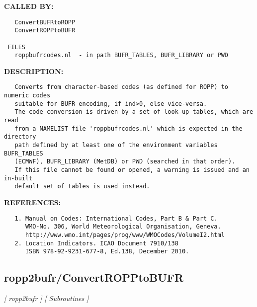 \textbf{CALLED BY:}\hspace{0.08in}\begin{Verbatim}
   ConvertBUFRtoROPP
   ConvertROPPtoBUFR

 FILES
   roppbufrcodes.nl  - in path BUFR_TABLES, BUFR_LIBRARY or PWD
\end{Verbatim}
\textbf{DESCRIPTION:}\hspace{0.08in}\begin{Verbatim}
   Converts from character-based codes (as defined for ROPP) to numeric codes
   suitable for BUFR encoding, if ind>0, else vice-versa.
   The code conversion is driven by a set of look-up tables, which are read
   from a NAMELIST file 'roppbufrcodes.nl' which is expected in the directory
   path defined by at least one of the environment variables BUFR_TABLES
   (ECMWF), BUFR_LIBRARY (MetDB) or PWD (searched in that order).
   If this file cannot be found or opened, a warning is issued and an in-built
   default set of tables is used instead.
\end{Verbatim}
\textbf{REFERENCES:}\hspace{0.08in}\begin{Verbatim}
   1. Manual on Codes: International Codes, Part B & Part C.
      WMO-No. 306, World Meteorological Organisation, Geneva.
      http://www.wmo.int/pages/prog/www/WMOCodes/VolumeI2.html
   2. Location Indicators. ICAO Document 7910/138
      ISBN 978-92-9231-677-8, Ed.138, December 2010.
\end{Verbatim}
\subsection{ropp2bufr/ConvertROPPtoBUFR}
\textsl{[ ropp2bufr ]}
\textsl{[ Subroutines ]}

